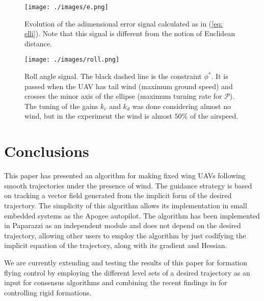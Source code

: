 \documentclass[letterpaper, 10 pt, conference]{ieeeconf}  %
\begin{document}
\begin{figure}
\centering
\texttt{[image: ./images/e.png]}
	\caption{Evolution of the adimensional error signal calculated as in (\ref{eq: elli}). Note that this signal is different from the notion of Euclidean distance.}
\label{fig: e}
\end{figure}

\begin{figure}
\centering
\texttt{[image: ./images/roll.png]}
\caption{Roll angle signal. The black dashed line is the constraint $\phi^*$. 
	It is passed when the UAV has tail wind (maximum ground speed) and crosses
	the minor axis of the ellipse (maximum turning rate for $\mathcal{P}$). The tuning of the gains $k_e$ and $k_d$ was done considering almost no wind, but in the experiment the wind is almost $50\%$ of the airspeed.}
\label{fig: roll}
\end{figure}


\section{Conclusions}
\label{sec: con}
This paper has presented an algorithm for making fixed wing UAVs following smooth trajectories under the presence of wind. The guidance strategy is based on tracking a vector field generated from the implicit form of the desired trajectory.
The simplicity of this algorithm allows its implementation in small embedded systems as the Apogee autopilot. The algorithm has been implemented in Paparazzi as an independent module and does not depend on the desired trajectory, allowing other users to employ the algorithm by just codifying the implicit equation of the trajectory, along with its gradient and Hessian. 

We are currently extending and testing the results of this paper for formation flying control by employing the different level sets of a desired trajectory as an input for consensus algorithms and combining the recent findings in \cite{de2016distributed,garcia2015controlling} for controlling rigid formations.



\end{document}
